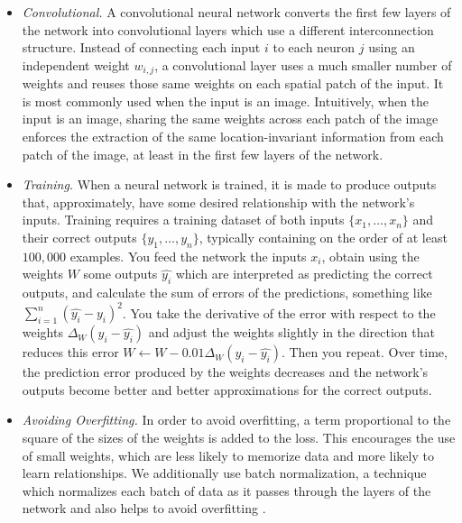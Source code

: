 \documentclass[10pt,letterpaper]{article}
\begin{document}
\begin{itemize}
                \item
                    \textit{Convolutional.}
                        A convolutional neural network converts the first few layers of the network into convolutional layers which use a different interconnection structure. Instead of connecting each input $i$ to each neuron $j$ using an independent weight $w_{i,j}$, a convolutional layer uses a much smaller number of weights and reuses those same weights on each spatial patch of the input. It is most commonly used when the input is an image. Intuitively, when the input is an image, sharing the same weights across each patch of the image enforces the extraction of the same location-invariant information from each patch of the image, at least in the first few layers of the network.
                
                \item
                    \textit{Training.}
                        When a neural network is trained, it is made to produce outputs that, approximately, have some desired relationship with the network's inputs. Training requires a training dataset of both inputs $\{x_1, \ldots, x_n\}$ and their correct outputs $\{y_1, \ldots, y_n\}$, typically containing on the order of at least $100,000$ examples. You feed the network the inputs $x_i$, obtain using the weights $W$ some outputs $\hat{y_i}$ which are interpreted as predicting the correct outputs, and calculate the sum of errors of the predictions, something like $\sum_{i = 1}^n (\hat{y_i} - y_i)^2$. You take the derivative of the error with respect to the weights $\Delta_W (y_i - \hat{y_i})$ and adjust the weights slightly in the direction that reduces this error $W \gets W - 0.01\Delta_W (y_i - \hat{y_i})$. Then you repeat. Over time, the prediction error produced by the weights decreases and the network's outputs become better and better approximations for the correct outputs.
                \item
                    \textit{Avoiding Overfitting.}
                        In order to avoid overfitting, a term proportional to the square of the sizes of the weights is added to the loss. This encourages the use of small weights, which are less likely to memorize data and more likely to learn relationships. We additionally use batch normalization, a technique which normalizes each batch of data as it passes through the layers of the network and also helps to avoid overfitting \cite{Ioffe}.
            \end{itemize}
\end{document}

